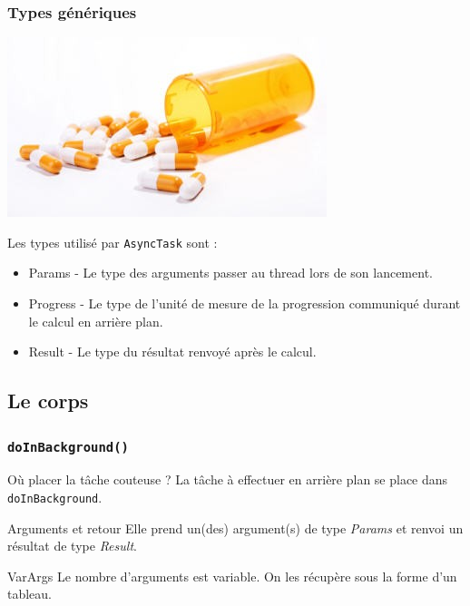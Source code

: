 \documentclass{beamer}
\begin{document}
\begin{frame}
\frametitle{Types génériques}

\begin{center}
\includegraphics[scale=0.5]{generic.jpg}
\end{center}
\begin{block}{Les types utilisé par \verb!AsyncTask! sont :}

\begin{itemize}
\item Params - Le type des arguments passer au thread lors de son lancement.
\item Progress - Le type de l'unité de mesure de la progression communiqué durant le calcul en arrière plan.
\item Result - Le type du résultat renvoyé après le calcul.
\end{itemize}

\end{block}
\end{frame}

\subsection{Le corps}
\begin{frame}
\frametitle{\verb!doInBackground()!}
\begin{block}{Où placer la tâche couteuse ?}
La tâche à effectuer en arrière plan se place dans \verb!doInBackground!.
\end{block}
\pause
\begin{block}{Arguments et retour}
Elle prend un(des) argument(s) de type \emph{Params} et renvoi un résultat de type \emph{Result}.
\end{block}
\pause
\begin{block}{VarArgs}
Le nombre d'arguments est variable. On les récupère sous la forme d'un tableau.
\end{block}
\end{frame}
\end{document}
